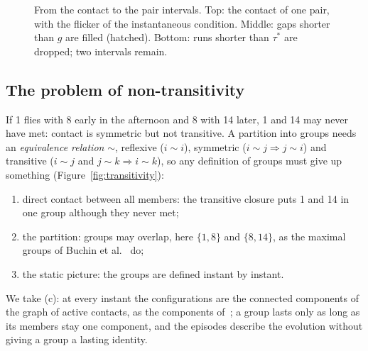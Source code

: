 \begin{figure}
\centering
{}
\caption{From the contact to the pair intervals. Top: the contact of one pair, with the flicker
of the instantaneous condition. Middle: gaps shorter than $g$ are filled (hatched). Bottom: runs
shorter than $\tau^*$ are dropped; two intervals remain.}
\label{fig:pair-intervals}
\end{figure}

\subsection{The problem of non-transitivity}\label{sec:transitivity}

If 1 flies with 8 early in the afternoon and 8 with 14 later, 1 and 14 may never have met: contact
is symmetric but not transitive. A partition into groups needs an \emph{equivalence relation}
$\sim$, reflexive ($i\sim i$), symmetric ($i\sim j\Rightarrow j\sim i$) and transitive ($i\sim j$
and $j\sim k\Rightarrow i\sim k$), so any definition of groups must give up something
(Figure~\ref{fig:transitivity}):
\begin{enumerate}[label=(\alph*)]
  \item direct contact between all members: the transitive closure puts 1 and 14 in one group
        although they never met;
  \item the partition: groups may overlap, here $\{1,8\}$ and $\{8,14\}$, as the maximal groups
        of Buchin et al.~\cite{buchin2015} do;
  \item the static picture: the groups are defined instant by instant.
\end{enumerate}
We take (c): at every instant the configurations are the connected components of the graph of
active contacts, as the components of~\cite{buchin2015}; a group lasts only as long as its
members stay one component, and the episodes describe the evolution without giving a group a
lasting identity.

